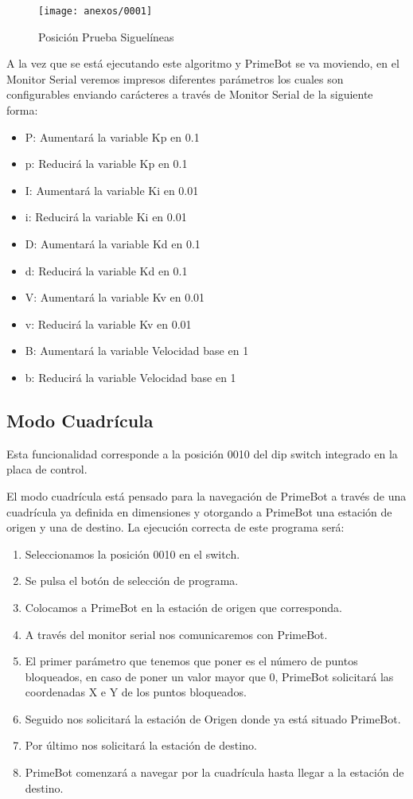 \begin{figure}[h]
	\centering
	\texttt{[image: anexos/0001]}
	\caption{Posición Prueba Siguelíneas}
	\label{fig:E.1}
\end{figure}

A la vez que se está ejecutando este algoritmo y PrimeBot se va moviendo, en el Monitor Serial veremos impresos diferentes parámetros los cuales son configurables enviando carácteres a través de Monitor Serial de la siguiente forma:
\begin{itemize}
\tightlist
\item
  P: Aumentará la variable Kp en 0.1
  \item
  p: Reducirá la variable Kp en 0.1
  \item
  I: Aumentará la variable Ki en 0.01
   \item
  i: Reducirá la variable Ki en 0.01
   \item
  D: Aumentará la variable Kd en 0.1
   \item
  d: Reducirá la variable Kd en 0.1
   \item
  V: Aumentará la variable Kv en 0.01
   \item
  v: Reducirá la variable Kv en 0.01
   \item
  B: Aumentará la variable Velocidad base en 1
   \item
  b: Reducirá la variable Velocidad base en 1
\end{itemize}

\subsection {Modo Cuadrícula}
Esta funcionalidad corresponde a la posición 0010 del dip switch integrado en la placa de control.

El modo cuadrícula está pensado para la navegación de PrimeBot a través de una cuadrícula ya definida en dimensiones y otorgando a PrimeBot una estación de origen y una de destino.
La ejecución correcta de este programa será:

\begin{enumerate}
\def\labelenumi{\arabic{enumi}.}
\tightlist
\item
Seleccionamos la posición 0010 en el switch.
\item
Se pulsa el botón de selección de programa.
\item
Colocamos a PrimeBot en la estación de origen que corresponda.
\item
A través del monitor serial nos comunicaremos con PrimeBot.
\item
El primer parámetro que tenemos que poner es el número de puntos bloqueados, en caso de poner un valor mayor que 0, PrimeBot solicitará las coordenadas X e Y de los puntos bloqueados.
\item
Seguido nos solicitará la estación de Origen donde ya está situado PrimeBot.
\item
Por último nos solicitará la estación de destino.
\item
PrimeBot comenzará a navegar por la cuadrícula hasta llegar a la estación de destino.
\end{enumerate}

